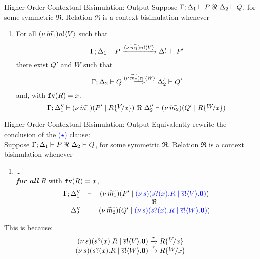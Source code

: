 \documentclass{beamer}
\newcommand{\prcolor}[1]{{\color{blue} #1}}
\begin{document}

	\begin{frame}{Higher-Order Contextual Bisimulation: Output}
		Suppose $\Gamma; \Delta_1 \proves P\ \Re\ \Delta_2 \proves Q$, for some symmetric $\Re$. Relation $\Re$ is
		a context bisimulation whenever
		\begin{enumerate}[$(\star)$]
			\item	For all $(\nu\, \widetilde{m_1}) n ! \langle V \rangle$ such that
				\[
					\Gamma; \Delta_1 \vdash P \xrightarrow{(\nu\, \widetilde{m_1}) n ! \langle V \rangle} \Delta_1' \vdash P'
				\]
				there exist $Q'$ and $W$ such that 
				\[
					\Gamma; \Delta_2 \vdash Q \stackrel{(\nu\, \widetilde{m_2}) n ! \langle W \rangle}{\Longrightarrow} \Delta_2' \vdash Q'
				\]
				and,   with $\mathtt{fv}(R)=x$, 
				\[
					\Gamma; \Delta_1'' \proves \newsp{\widetilde{m_1}}{P' \Par R\subst{V}{x}}\ \Re\ \Delta_2'' \proves \newsp{\widetilde{m_2}}{Q' \Par R\subst{W}{x}}
				\]
		\end{enumerate}
	\end{frame}

	\begin{frame}{Higher-Order Contextual Bisimulation: Output}
		Equivalently rewrite the conclusion of the \textcolor{blue}{($\star$)} clause:
		\\[2mm]

		Suppose $\Gamma; \Delta_1 \proves P\ \Re\ \Delta_2 \proves Q$, for some symmetric $\Re$. Relation $\Re$ is
		a context bisimulation whenever
		\begin{enumerate}[$(\star)$]
			\item	\dots\\
				\emph{\textbf{for all} $R$}  with $\mathtt{fv}(R)=x$, 
				\[
					\begin{array}{rcc}
						\Gamma; \Delta_1'' &\proves& \newsp{\widetilde{m_1}}{P' \Par \prcolor{\newsp{s}{\binp{s}{x} R \Par  \bout{\dual{s}}{V} \inact}}}
						\\
						&&\Re
						\\
						\Delta_2'' &\proves&  \newsp{\widetilde{m_2}}{Q' \Par \prcolor{\newsp{s}{\binp{s}{x} R \Par \bout{\dual{s}}{W} \inact}}}
					\end{array}
				\]
		\end{enumerate}
		This is because:
		\[
			\begin{array}{c}
				\newsp{s}{\binp{s}{x} R \Par \bout{\dual{s}}{V} \inact}
				\by{\tau}
				R \subst{V}{x}
				\\
				\newsp{s}{\binp{s}{x} R \Par \bout{\dual{s}}{W} \inact}
				\by{\tau}
				R \subst{W}{x}
			\end{array}
		\]
	\end{frame}
\end{document}
